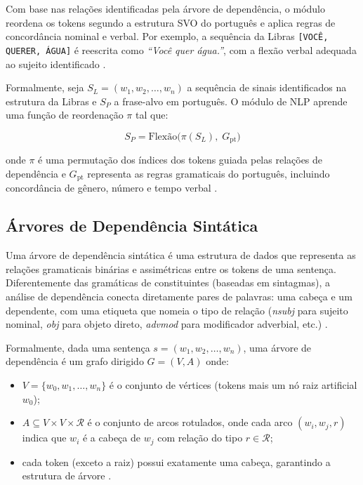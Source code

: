 \documentclass[
    12pt,                %
    openright,           %
    oneside,             %
    a4paper,             %
    english,             %
    brazil               %
]{abntex2}
\begin{document}
Com base nas relações identificadas pela árvore de dependência, o módulo reordena os tokens segundo a estrutura SVO do português e aplica regras de concordância nominal e verbal. Por exemplo, a sequência da Libras \texttt{[VOCÊ, QUERER, ÁGUA]} é reescrita como \textit{``Você quer água.''}, com a flexão verbal adequada ao sujeito identificado \cite{Lopez2017}.

Formalmente, seja $S_L = (w_1, w_2, \ldots, w_n)$ a sequência de sinais identificados na estrutura da Libras e $S_P$ a frase-alvo em português. O módulo de NLP aprende uma função de reordenação $\pi$ tal que: 

\begin{equation}
    S_P = \text{Flexão}\bigl(\pi(S_L),\; G_{\text{pt}}\bigr)
\end{equation}

onde $\pi$ é uma permutação dos índices dos tokens guiada pelas relações de dependência e $G_{\text{pt}}$ representa as regras gramaticais do português, incluindo concordância de gênero, número e tempo verbal \cite{Bird2009}.

\subsection{Árvores de Dependência Sintática}

Uma árvore de dependência sintática é uma estrutura de dados que representa as relações gramaticais binárias e assimétricas entre os tokens de uma sentença. Diferentemente das gramáticas de constituintes (baseadas em sintagmas), a análise de dependência conecta diretamente pares de palavras: uma cabeça e um dependente, com uma etiqueta que nomeia o tipo de relação (\textit{nsubj} para sujeito nominal, \textit{obj} para objeto direto, \textit{advmod} para modificador adverbial, etc.) \cite{Jurafsky2023}.

Formalmente, dada uma sentença $s = (w_1, w_2, \ldots, w_n)$, uma árvore de dependência é um grafo dirigido $G = (V, A)$ onde:

\begin{itemize}
    \item $V = \{w_0, w_1, \ldots, w_n\}$ é o conjunto de vértices (tokens mais um nó raiz artificial $w_0$);
    \item $A \subseteq V \times V \times \mathcal{R}$ é o conjunto de arcos rotulados, onde cada arco $(w_i, w_j, r)$ indica que $w_i$ é a cabeça de $w_j$ com relação do tipo $r \in \mathcal{R}$;
    \item cada token (exceto a raiz) possui exatamente uma cabeça, garantindo a estrutura de árvore \cite{Jurafsky2023}.
\end{itemize}
\end{document}
